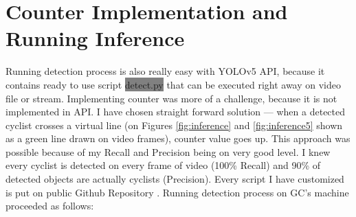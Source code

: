\section{Counter Implementation and Running Inference}
\label{sec:inference}
Running detection process is also really easy with YOLOv5 API, because it contains ready to use script \colorbox{Gray}{detect.py} that can be executed right away on video file or stream. Implementing counter was more of a challenge, because it is not implemented in API. I have chosen straight forward solution --- when a detected cyclist crosses a virtual line (on Figures \ref{fig:inference} and \ref{fig:inference5} shown as a green line drawn on video frames), counter value goes up. This approach was possible because of my Recall and Precision being on very good level. I knew every cyclist is detected on every frame of video (100\% Recall) and 90\% of detected objects are actually cyclists (Precision). Every script I have customized is put on public Github Repository \cite{repo}. Running detection process on GC's machine proceeded as follows:
